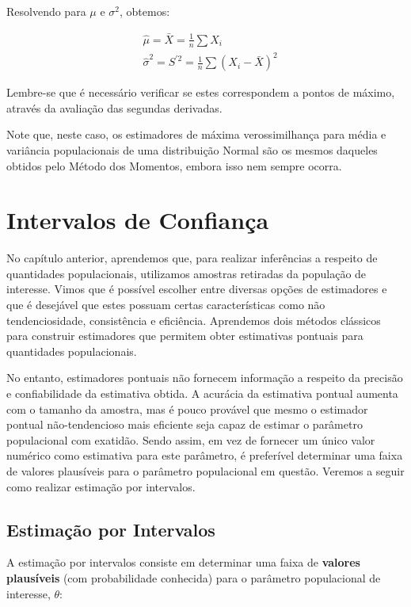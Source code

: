 \documentclass[
]{book}
\theoremstyle{definition}
\theoremstyle{definition}
\theoremstyle{definition}
\theoremstyle{remark}
\begin{document}
Resolvendo para \(\mu\) e \(\sigma^2\), obtemos:

\begin{align*}
&\hat{\mu} = \bar{X} = \frac{1}{n} \sum X_i \\
&\hat{\sigma}^2 = S^{\prime 2} = \frac{1}{n} \sum (X_i - \bar{X})^2
\end{align*}

Lembre-se que é necessário verificar se estes correspondem a pontos de máximo, através da avaliação das segundas derivadas.

Note que, neste caso, os estimadores de máxima verossimilhança para média e variância populacionais de uma distribuição Normal são os mesmos daqueles obtidos pelo Método dos Momentos, embora isso nem sempre ocorra.

\hypertarget{intervalos-de-confianuxe7a}{%
\chapter{Intervalos de Confiança}\label{intervalos-de-confianuxe7a}}

No capítulo anterior, aprendemos que, para realizar inferências a respeito de quantidades populacionais, utilizamos amostras retiradas da população de interesse. Vimos que é possível escolher entre diversas opções de estimadores e que é desejável que estes possuam certas características como não tendenciosidade, consistência e eficiência. Aprendemos dois métodos clássicos para construir estimadores que permitem obter estimativas pontuais para quantidades populacionais.

No entanto, estimadores pontuais não fornecem informação a respeito da precisão e confiabilidade da estimativa obtida. A acurácia da estimativa pontual aumenta com o tamanho da amostra, mas é pouco provável que mesmo o estimador pontual não-tendencioso mais eficiente seja capaz de estimar o parâmetro populacional com exatidão. Sendo assim, em vez de fornecer um único valor numérico como estimativa para este parâmetro, é preferível determinar uma faixa de valores plausíveis para o parâmetro populacional em questão. Veremos a seguir como realizar estimação por intervalos.

\hypertarget{estimauxe7uxe3o-por-intervalos}{%
\section{Estimação por Intervalos}\label{estimauxe7uxe3o-por-intervalos}}

A estimação por intervalos consiste em determinar uma faixa de \textbf{valores plausíveis} (com probabilidade conhecida) para o parâmetro populacional de interesse, \(\theta\):
\end{document}
